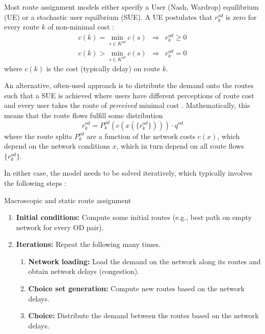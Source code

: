 Most route assignment models either specify a User (Nash, Wardrop) equilibrium (UE) 
or a stochastic user equilbrium (SUE).  
A UE postulates that $r^{od}_k$ is zero for every route $k$ of non-minimal cost \citep{Wardrop1952TheoreticalAspects}:
\begin{eqnarray}
c(k)=\min_{s\in K^{od}}c(s) & \Rightarrow & r^{od}_{k}\geq0\\
c(k)>\min_{s\in K^{od}}c(s) & \Rightarrow & r^{od}_{k}=0
\end{eqnarray}
where $c(k)$ is the cost (typically delay) on route $k$.
 
An alternative, often-used approach is to distribute the demand onto
the routes such that a SUE is
achieved where users have different perceptions of route cost and
every user takes the route of \emph{perceived} minimal cost \citep{daganzo-1977}.
Mathematically, this means that the route flows fulfill some distribution
\begin{equation}
r^{od}_k = P^{od}_k(c(x(\{r^{od}_k\}))) \cdot q^{od}
\label{stoch-equil}
\end{equation}
where the route splits $P^{od}_k$ are a function of the network costs
$c(x)$, which depend on the network conditions $x$,
which in turn depend on all route flows $\{r^{od}_k\}$.

In either case, the model needs to be solved iteratively, 
which typically involves the following steps \citep{sheffi-1985}:

\begin{algorithm}[H]
\label{static-macro-routes}

\caption{Macroscopic and static route assignment}

\begin{enumerate}

\item \textbf{Initial conditions:} Compute some initial routes
  (e.g., best path on empty network for every OD pair).

\item \textbf{Iterations:} Repeat the following many times.

\begin{enumerate}

\item \textbf{Network loading:} Load the demand on the network along
  its routes and obtain network delays (congestion).

\item \textbf{Choice set generation:} Compute new routes based on the
  network delays.

\item \textbf{Choice:} Distribute the demand between the routes based
  on the network delays.

\end{enumerate} %

\end{enumerate}

\end{algorithm}

